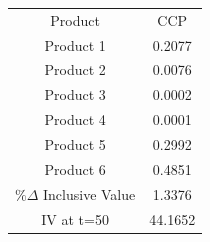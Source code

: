 \begin{tabular}{cc}
Product & CCP \\
Product 1 & 0.2077 \\
Product 2 & 0.0076 \\
Product 3 & 0.0002 \\
Product 4 & 0.0001 \\
Product 5 & 0.2992 \\
Product 6 & 0.4851 \\
$\%\Delta$ Inclusive Value & 1.3376 \\
IV at t=50 & 44.1652 \\
\end{tabular}